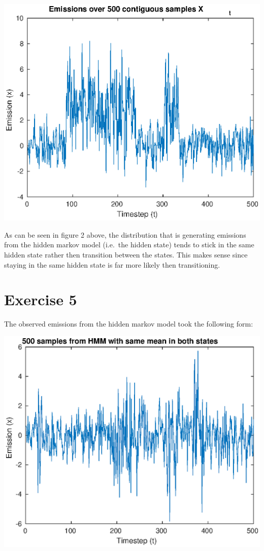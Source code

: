 \documentclass[]{article}
\let\origfigure\figure
\let\endorigfigure\endfigure
\renewenvironment{figure}[1][2] {
    \expandafter\origfigure\expandafter[H]
} {
    \endorigfigure
}
\begin{document}
\begin{figure}
\centering
\includegraphics{Result_Pics/emissionDistr.eps}
\caption{Samples from 500 contiguous samples from the hmm rand function}
\end{figure}

As can be seen in figure 2 above, the distribution that is generating
emissions from the hidden markov model (i.e.~the hidden state) tends to
stick in the same hidden state rather then transition between the
states. This makes sense since staying in the same hidden state is far
more likely then transitioning.

\newpage

\hypertarget{exercise-5}{%
\section{Exercise 5}\label{exercise-5}}

The observed emissions from the hidden markov model took the following
form:

\begin{figure}
\centering
\includegraphics{Result_Pics/emissionDistrEqual.eps}
\caption{Samples from HMM with \(\mu_1 = \mu_2 = 0\)}
\end{figure}
\end{document}
